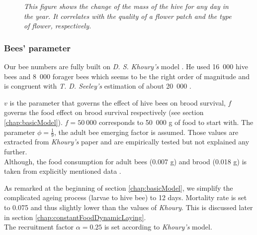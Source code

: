 			\begin{figure}
				\centering
				\caption{\textit{This figure shows the change of the mass of the hive for any day in the year. It correlates with the quality of a flower patch and the type of flower, respectively.}}
				\label{fig:seasonalFlowers}
			\end{figure}
			
			\subsubsection{Bees' parameter}
			Our bee numbers are fully built on \textit{D. S. Khoury's} model \cite{khoury13}. He used 16~000 hive bees and 8~000 forager bees which seems to be the right order of magnitude and is congruent with \textit{T. D. Seeley's} estimation of about 20~000 \cite{seeley95}. 
			
			
			$v$ is the parameter that governs the effect of hive bees on brood survival, $f$ governs the food effect on brood survival respectively (see section \ref{chap:basicModel}). $f=50~000$ corresponds to 50~000 g of food to start with. The parameter $\phi=\frac{1}{9}$, the adult bee emerging factor is assumed. Those values are extracted from \textit{Khoury's} paper and are empirically tested but not explained any further.\\ Although, the food consumption for adult bees (0.007 g) and brood (0.018 g) is taken from explicitly mentioned data \cite{harbo93}.
					
			As remarked at the beginning of section \ref{chap:basicModel}, we simplify the complicated ageing process (larvae to hive bee) to 12 days. Mortality rate is set to 0.075 and thus slightly lower than the values of \textit{Khoury}. This is discussed later in section \ref{chap:constantFoodDynamicLaying}.
			\\
			The recruitment factor $\alpha = 0.25$ is set according to \textit{Khoury's} model.
			
		

